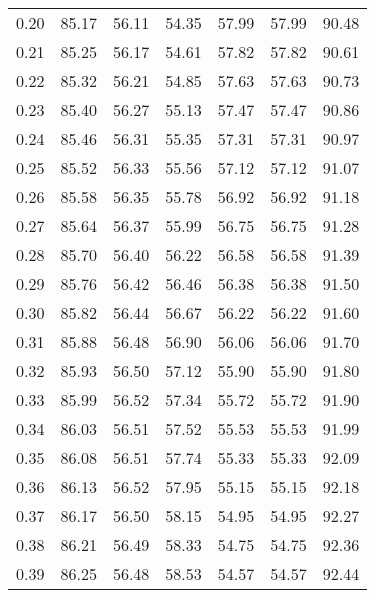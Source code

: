 \begin{tabular}{|c|c|c|c|c|c|c|}
      0.20 &     85.17 &     56.11 &      54.35 &   57.99 &      57.99 &         90.48 \\
      0.21 &     85.25 &     56.17 &      54.61 &   57.82 &      57.82 &         90.61 \\
      0.22 &     85.32 &     56.21 &      54.85 &   57.63 &      57.63 &         90.73 \\
      0.23 &     85.40 &     56.27 &      55.13 &   57.47 &      57.47 &         90.86 \\
      0.24 &     85.46 &     56.31 &      55.35 &   57.31 &      57.31 &         90.97 \\
      0.25 &     85.52 &     56.33 &      55.56 &   57.12 &      57.12 &         91.07 \\
      0.26 &     85.58 &     56.35 &      55.78 &   56.92 &      56.92 &         91.18 \\
      0.27 &     85.64 &     56.37 &      55.99 &   56.75 &      56.75 &         91.28 \\
      0.28 &     85.70 &     56.40 &      56.22 &   56.58 &      56.58 &         91.39 \\
      0.29 &     85.76 &     56.42 &      56.46 &   56.38 &      56.38 &         91.50 \\
      0.30 &     85.82 &     56.44 &      56.67 &   56.22 &      56.22 &         91.60 \\
      0.31 &     85.88 &     56.48 &      56.90 &   56.06 &      56.06 &         91.70 \\
      0.32 &     85.93 &     56.50 &      57.12 &   55.90 &      55.90 &         91.80 \\
      0.33 &     85.99 &     56.52 &      57.34 &   55.72 &      55.72 &         91.90 \\
      0.34 &     86.03 &     56.51 &      57.52 &   55.53 &      55.53 &         91.99 \\
      0.35 &     86.08 &     56.51 &      57.74 &   55.33 &      55.33 &         92.09 \\
      0.36 &     86.13 &     56.52 &      57.95 &   55.15 &      55.15 &         92.18 \\
      0.37 &     86.17 &     56.50 &      58.15 &   54.95 &      54.95 &         92.27 \\
      0.38 &     86.21 &     56.49 &      58.33 &   54.75 &      54.75 &         92.36 \\
      0.39 &     86.25 &     56.48 &      58.53 &   54.57 &      54.57 &         92.44 \\

\end{tabular}
